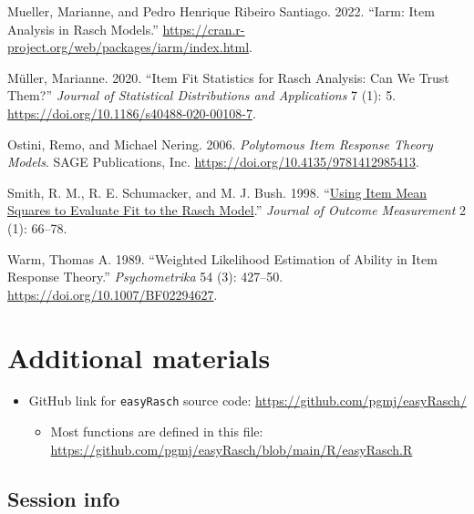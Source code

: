\documentclass[
  letterpaper,
  DIV=11,
  numbers=noendperiod]{scrartcl}
\providecommand{\tightlist}{%
  \setlength{\itemsep}{0pt}\setlength{\parskip}{0pt}}\usepackage{longtable,booktabs,array}
\newlength{\cslhangindent}
\newenvironment{CSLReferences}[2] %
 {\begin{list}{}{%
  \setlength{\itemindent}{0pt}
  \setlength{\leftmargin}{0pt}
  \setlength{\parsep}{0pt}
  \ifodd #1
   \setlength{\leftmargin}{\cslhangindent}
   \setlength{\itemindent}{-1\cslhangindent}
  \fi
  \setlength{\itemsep}{#2\baselineskip}}}
 {\end{list}}
\begin{document}
\begin{CSLReferences}{1}{0}
Mueller, Marianne, and Pedro Henrique Ribeiro Santiago. 2022. {``Iarm:
{Item} {Analysis} in {Rasch} {Models}.''}
\url{https://cran.r-project.org/web/packages/iarm/index.html}.

Müller, Marianne. 2020. {``Item Fit Statistics for {Rasch} Analysis: Can
We Trust Them?''} \emph{Journal of Statistical Distributions and
Applications} 7 (1): 5.
\url{https://doi.org/10.1186/s40488-020-00108-7}.

Ostini, Remo, and Michael Nering. 2006. \emph{Polytomous {Item}
{Response} {Theory} {Models}}. SAGE Publications, Inc.
\url{https://doi.org/10.4135/9781412985413}.

Smith, R. M., R. E. Schumacker, and M. J. Bush. 1998.
{``\href{https://www.ncbi.nlm.nih.gov/pubmed/9661732}{Using Item Mean
Squares to Evaluate Fit to the {Rasch} Model}.''} \emph{Journal of
Outcome Measurement} 2 (1): 66--78.

Warm, Thomas A. 1989. {``Weighted Likelihood Estimation of Ability in
Item Response Theory.''} \emph{Psychometrika} 54 (3): 427--50.
\url{https://doi.org/10.1007/BF02294627}.

\end{CSLReferences}

\section{Additional materials}\label{sec-addmat}

\begin{itemize}
\tightlist
\item
  GitHub link for \texttt{easyRasch} source code:
  \url{https://github.com/pgmj/easyRasch/}

  \begin{itemize}
  \tightlist
  \item
    Most functions are defined in this file:
    \url{https://github.com/pgmj/easyRasch/blob/main/R/easyRasch.R}
  \end{itemize}
\end{itemize}

\subsection{Session info}\label{session-info}
\end{document}
